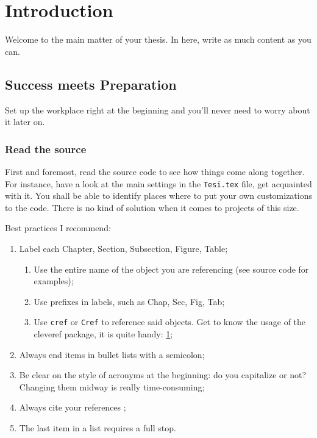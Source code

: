 \chapter{Introduction}
\label{chap: Introduction}

\thispagestyle{chapter}

Welcome to the main matter of your thesis. In here, write as much content as you can.

\section{Success meets Preparation}
\label{sec: Success meets Preparation}

Set up the workplace right at the beginning and you'll never need to worry about it later on.

\subsection{Read the source}
\label{sec: Read the source}

First and foremost, read the source code to see how things come along together. For instance, have a look at the main settings in the \lstinline{Tesi.tex} file, get acquainted with it. You shall be able to identify places where to put your own customizations to the code. There is no  kind of solution when it comes to projects of this size.

Best practices I recommend:
\begin{enumerate}
\item Label each Chapter, Section, Subsection, Figure, Table;
\begin{enumerate}
\item Use the entire name of the object you are referencing (see source code for examples);
\item Use prefixes in labels, such as Chap, Sec, Fig, Tab;
\item Use \lstinline{cref} or \lstinline{Cref} to reference said objects. Get to know the usage of the cleveref package, it is quite handy: \cref{chap: Introduction};
\end{enumerate}
\item Always end items in bullet lists with a semicolon;
\item Be clear on the style of acronyms at the beginning: do you capitalize or not? Changing them midway is really time-consuming;
\item Always cite your references \cite{dummy2017tutorial};
\item The last item in a list requires a full stop.
\end{enumerate}

